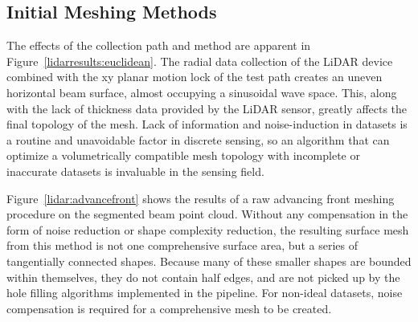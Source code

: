 \documentclass[12pt]{drexelthesis}
\let\Oldsubsection\subsection
\renewcommand{\subsection}{\FloatBarrier\Oldsubsection}
\begin{document}
\subsection{Initial Meshing Methods}

The effects of the collection path and method are apparent in Figure~\ref{lidarresults:euclidean}. The radial data collection of the LiDAR device combined with the xy planar motion lock of the test path creates an uneven horizontal beam surface, almost occupying a sinusoidal wave space. This, along with the lack of thickness data provided by the LiDAR sensor, greatly affects the final topology of the mesh. Lack of information and noise-induction in datasets is a routine and unavoidable factor in discrete sensing, so an algorithm that can optimize a volumetrically compatible mesh topology with incomplete or inaccurate datasets is invaluable in the sensing field.

Figure~\ref{lidar:advancefront} shows the results of a raw advancing front meshing procedure on the segmented beam point cloud. Without any compensation in the form of noise reduction or shape complexity reduction, the resulting surface mesh from this method is not one comprehensive surface area, but a series of tangentially connected shapes. Because many of these smaller shapes are bounded within themselves, they do not contain half edges, and are not picked up by the hole filling algorithms implemented in the pipeline. For non-ideal datasets, noise compensation is required for a comprehensive mesh to be created.
\end{document}
